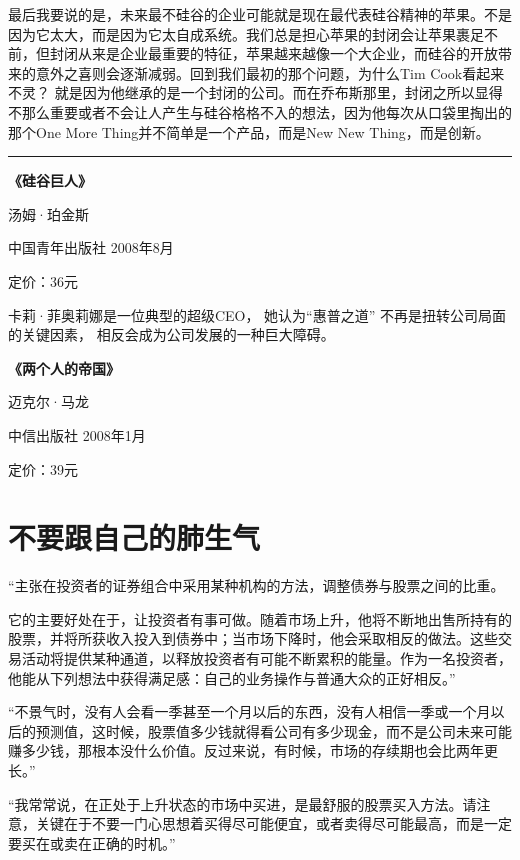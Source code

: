 最后我要说的是，未来最不硅谷的企业可能就是现在最代表硅谷精神的苹果。不是因为它太大，而是因为它太自成系统。我们总是担心苹果的封闭会让苹果裹足不前，但封闭从来是企业最重要的特征，苹果越来越像一个大企业，而硅谷的开放带来的意外之喜则会逐渐减弱。回到我们最初的那个问题，为什么Tim
Cook看起来不灵？
就是因为他继承的是一个封闭的公司。而在乔布斯那里，封闭之所以显得不那么重要或者不会让人产生与硅谷格格不入的想法，因为他每次从口袋里掏出的那个One
More Thing并不简单是一个产品，而是New New Thing，而是创新。

\begin{center}\rule{0.5\linewidth}{0.5pt}\end{center}

\textbf{《硅谷巨人》}

汤姆·珀金斯

中国青年出版社 2008年8月

定价：36元

卡莉·菲奥莉娜是一位典型的超级CEO， 她认为``惠普之道''
不再是扭转公司局面的关键因素， 相反会成为公司发展的一种巨大障碍。

\textbf{《两个人的帝国》}

迈克尔·马龙

中信出版社 2008年1月

定价：39元

\hypertarget{ux4e0dux8981ux8ddfux81eaux5df1ux7684ux80baux751fux6c14}{%
\section{不要跟自己的肺生气}\label{ux4e0dux8981ux8ddfux81eaux5df1ux7684ux80baux751fux6c14}}

``主张在投资者的证券组合中采用某种机构的方法，调整债券与股票之间的比重。

它的主要好处在于，让投资者有事可做。随着市场上升，他将不断地出售所持有的股票，并将所获收入投入到债券中；当市场下降时，他会采取相反的做法。这些交易活动将提供某种通道，以释放投资者有可能不断累积的能量。作为一名投资者，他能从下列想法中获得满足感：自己的业务操作与普通大众的正好相反。''

``不景气时，没有人会看一季甚至一个月以后的东西，没有人相信一季或一个月以后的预测值，这时候，股票值多少钱就得看公司有多少现金，而不是公司未来可能赚多少钱，那根本没什么价值。反过来说，有时候，市场的存续期也会比两年更长。''

``我常常说，在正处于上升状态的市场中买进，是最舒服的股票买入方法。请注意，关键在于不要一门心思想着买得尽可能便宜，或者卖得尽可能最高，而是一定要买在或卖在正确的时机。''

